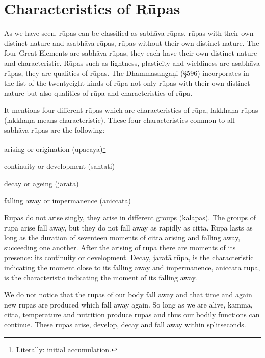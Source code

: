 \documentclass{book}
\begin{document}
\section*{Characteristics of R\=upas}


As we have seen, r\=upas can be classified as sabh{\=a}va r\=upas,
r\=upas with their own distinct nature and asabh{\=a}va r\=upas,
r\=upas without their own distinct nature. The four Great Elements are
sabh{\=a}va r\=upas, they each have their own distinct nature and
characteristic. R\=upas such as lightness, plasticity and wieldiness
are asabh{\=a}va r\=upas, they are qualities of r\=upas. The
Dhamma\-sanga\d ni ({\S}596) incorporates in the list of the twentyeight
kinds of r\=upa not only r\=upas with their own distinct nature but
also qualities of r\=upa and characteristics of r\=upa. 

It mentions four different r\=upas which are characteristics of r\=upa,
lakkha\d na r\=upas (lakkha\d na means characteristic). These four
characteristics common to all sabh{\=a}va r\=upas are the following: 



\begin{description}
\item arising or origination (upacaya)\footnote{Literally: initial accumulation.}

\item continuity or development (santati)

\item decay or ageing (jarat{\=a})

\item falling away or impermanence (aniccat{\=a})
\end{description}




R\=upas do not arise singly, they arise in different groups
(kal{\=a}pas). The groups of r\=upa arise fall away, but they do not
fall away as rapidly as citta. R\=upa lasts as long as the duration of
seventeen moments of citta arising and falling away, succeeding one
another. After the arising of r\=upa there are moments of its presence:
its continuity or development. Decay, jarat{\=a} r\=upa, is the
characteristic indicating the moment close to its falling away and
impermanence, aniccat{\=a} r\=upa, is the characteristic indicating the
moment of its falling away. 

We do not notice that the r\=upas of our body fall away and that time
and again new r\=upas are produced which fall away again. So long as we
are alive, kamma, citta, temperature and nutrition produce r\=upas and
thus our bodily functions can continue. These r\=upas arise, develop,
decay and fall away within splitseconds. 
\end{document}
